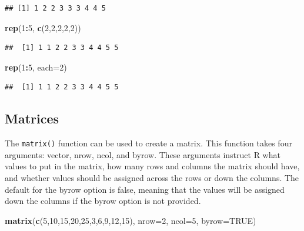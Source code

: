 \documentclass[
]{book}
\newenvironment{Shaded}{\begin{snugshade}}{\end{snugshade}}
\newcommand{\AttributeTok}[1]{\textcolor[rgb]{0.13,0.29,0.53}{#1}}
\newcommand{\ConstantTok}[1]{\textcolor[rgb]{0.56,0.35,0.01}{#1}}
\newcommand{\DecValTok}[1]{\textcolor[rgb]{0.00,0.00,0.81}{#1}}
\newcommand{\FunctionTok}[1]{\textcolor[rgb]{0.13,0.29,0.53}{\textbf{#1}}}
\newcommand{\NormalTok}[1]{#1}
\newcommand{\SpecialCharTok}[1]{\textcolor[rgb]{0.81,0.36,0.00}{\textbf{#1}}}
\theoremstyle{definition}
\theoremstyle{definition}
\theoremstyle{definition}
\theoremstyle{definition}
\theoremstyle{remark}
\begin{document}
\begin{verbatim}
## [1] 1 2 2 3 3 3 4 4 5
\end{verbatim}

\begin{Shaded}
\begin{Highlighting}[]
\FunctionTok{rep}\NormalTok{(}\DecValTok{1}\SpecialCharTok{:}\DecValTok{5}\NormalTok{, }\FunctionTok{c}\NormalTok{(}\DecValTok{2}\NormalTok{,}\DecValTok{2}\NormalTok{,}\DecValTok{2}\NormalTok{,}\DecValTok{2}\NormalTok{,}\DecValTok{2}\NormalTok{))}
\end{Highlighting}
\end{Shaded}

\begin{verbatim}
##  [1] 1 1 2 2 3 3 4 4 5 5
\end{verbatim}

\begin{Shaded}
\begin{Highlighting}[]
\FunctionTok{rep}\NormalTok{(}\DecValTok{1}\SpecialCharTok{:}\DecValTok{5}\NormalTok{, }\AttributeTok{each=}\DecValTok{2}\NormalTok{)}
\end{Highlighting}
\end{Shaded}

\begin{verbatim}
##  [1] 1 1 2 2 3 3 4 4 5 5
\end{verbatim}

\hypertarget{mat}{%
\subsection{Matrices}\label{mat}}

The \texttt{matrix()} function can be used to create a matrix. This function takes four arguments: vector, nrow, ncol, and byrow. These arguments instruct R what values to put in the matrix, how many rows and columns the matrix should have, and whether values should be assigned across the rows or down the columns. The default for the byrow option is false, meaning that the values will be assigned down the columns if the byrow option is not provided.

\begin{Shaded}
\begin{Highlighting}[]
\FunctionTok{matrix}\NormalTok{(}\FunctionTok{c}\NormalTok{(}\DecValTok{5}\NormalTok{,}\DecValTok{10}\NormalTok{,}\DecValTok{15}\NormalTok{,}\DecValTok{20}\NormalTok{,}\DecValTok{25}\NormalTok{,}\DecValTok{3}\NormalTok{,}\DecValTok{6}\NormalTok{,}\DecValTok{9}\NormalTok{,}\DecValTok{12}\NormalTok{,}\DecValTok{15}\NormalTok{), }\AttributeTok{nrow=}\DecValTok{2}\NormalTok{, }\AttributeTok{ncol=}\DecValTok{5}\NormalTok{, }\AttributeTok{byrow=}\ConstantTok{TRUE}\NormalTok{)}
\end{Highlighting}
\end{Shaded}
\end{document}
